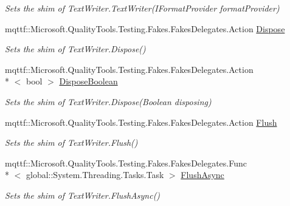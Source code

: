 \begin{DoxyCompactItemize}
\begin{DoxyCompactList}\small\item\em Sets the shim of Text\-Writer.\-Text\-Writer(\-I\-Format\-Provider format\-Provider)\end{DoxyCompactList}\item 
mqttf\-::\-Microsoft.\-Quality\-Tools.\-Testing.\-Fakes.\-Fakes\-Delegates.\-Action \hyperlink{class_system_1_1_i_o_1_1_fakes_1_1_shim_text_writer_ae6b51199dda80edef90c7da8e49eaec5}{Dispose}
\begin{DoxyCompactList}\small\item\em Sets the shim of Text\-Writer.\-Dispose()\end{DoxyCompactList}\item 
mqttf\-::\-Microsoft.\-Quality\-Tools.\-Testing.\-Fakes.\-Fakes\-Delegates.\-Action\\*
$<$ bool $>$ \hyperlink{class_system_1_1_i_o_1_1_fakes_1_1_shim_text_writer_a043c8e71185d431028cd527d8a89112b}{Dispose\-Boolean}
\begin{DoxyCompactList}\small\item\em Sets the shim of Text\-Writer.\-Dispose(\-Boolean disposing)\end{DoxyCompactList}\item 
mqttf\-::\-Microsoft.\-Quality\-Tools.\-Testing.\-Fakes.\-Fakes\-Delegates.\-Action \hyperlink{class_system_1_1_i_o_1_1_fakes_1_1_shim_text_writer_afc4050faa198b9197aa55a1d40f5fb66}{Flush}
\begin{DoxyCompactList}\small\item\em Sets the shim of Text\-Writer.\-Flush()\end{DoxyCompactList}\item 
mqttf\-::\-Microsoft.\-Quality\-Tools.\-Testing.\-Fakes.\-Fakes\-Delegates.\-Func\\*
$<$ global\-::\-System.\-Threading.\-Tasks.\-Task $>$ \hyperlink{class_system_1_1_i_o_1_1_fakes_1_1_shim_text_writer_aa5baf814318714b491ef2c8a5eb74f63}{Flush\-Async}
\begin{DoxyCompactList}\small\item\em Sets the shim of Text\-Writer.\-Flush\-Async()\end{DoxyCompactList}\item 

\end{DoxyCompactItemize}
